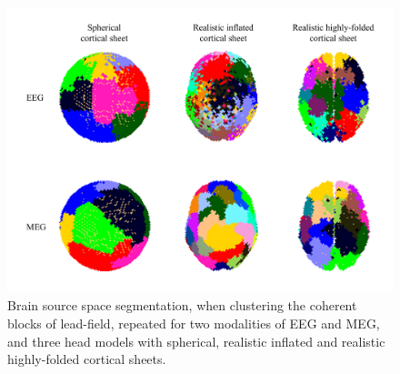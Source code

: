 \begin{figure}[!b]
\centering
\includegraphics[width=1\textwidth,keepaspectratio]{images/EMEG-LF-clustering-regions.png} %
\centering
\caption{Brain source space segmentation, when clustering the coherent blocks of lead-field, repeated for two modalities of EEG and MEG, and three head models with spherical, realistic inflated and realistic highly-folded cortical sheets.}
\label{fig:EMEG-LF-clustering-regions}
\end{figure}